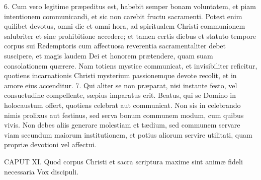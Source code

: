 6. Cum vero legitime præpeditus est, habebit semper bonam voluntatem, et piam intentionem communicandi, et sic non carebit fructu sacramenti. Potest enim quilibet devotus, omni die et omni hora, ad spiritualem Christi communionem salubriter et sine prohibitione accedere; et tamen certis diebus et statuto tempore corpus sui Redemptoris cum affectuosa reverentia sacramentaliter debet suscipere, et magis laudem Dei et honorem prætendere, quam suam consolationem quærere. Nam totiens mystice communicat, et invisibiliter reficitur, quotiens incarnationis Christi mysterium passionemque devote recolit, et in amore eius accenditur.
7. Qui aliter se non præparat, nisi instante festo, vel consuetudine compellente, sæpius imparatus erit. Beatus, qui se Domino in holocaustum offert, quotiens celebrat aut communicat. Non sis in celebrando nimis prolixus aut festinus, sed serva bonum communem modum, cum quibus vivis. Non debes aliis generare molestiam et tædium, sed communem servare viam secundum maiorum institutionem, et potius aliorum servire utilitati, quam propriæ devotioni vel affectui.


CAPUT XI.
Quod corpus Christi et sacra scriptura maxime sint animæ fideli necessaria
Vox discipuli.

